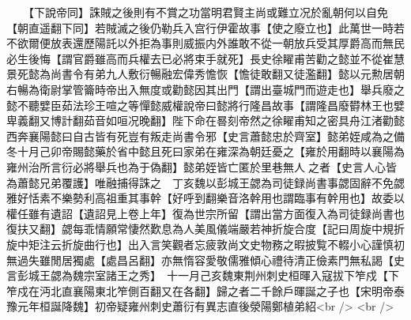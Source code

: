 　　【下說帝同】誅賊之後則有不賞之功當明君賢主尚或難立况於亂朝何以自免【朝直遥翻下同】若賊滅之後仍勒兵入宫行伊霍故事【使之廢立也】此萬世一時若不欲爾便放表還歷陽託以外拒為事則威振内外誰敢不從一朝放兵受其厚爵高而無民必生後悔【謂官爵雖高而兵權去已必將束手就死】長史徐矅甫苦勸之懿並不從崔慧景死懿為尚書令有弟九人敷衍暢融宏偉秀憺恢【憺徒敢翻又徒濫翻】懿以元勲居朝右暢為衛尉掌管籥時帝出入無度或勸懿因其出門【謂出臺城門而遊走也】舉兵廢之懿不聽嬖臣茹法珍王喧之等憚懿威權說帝曰懿將行隆昌故事【謂隆昌廢欎林王也嬖卑義翻又博計翻茹音如咺况晚翻】陛下命在晷刻帝然之徐矅甫知之密具舟江渚勸懿西奔襄陽懿曰自古皆有死豈有叛走尚書令邪【史言蕭懿忠於齊室】懿弟姪咸為之備冬十月己卯帝賜懿藥於省中懿且死曰家弟在雍深為朝廷憂之【雍於用翻時以襄陽為雍州治所言衍必將舉兵也為于偽翻】懿弟姪皆亡匿於里巷無人之者【史言人心皆為蕭懿兄弟覆護】唯融捕得誅之　丁亥魏以彭城王勰為司徒録尚書事勰固辭不免勰雅好恬素不樂勢利高祖重其事幹【好呼到翻樂音洛幹用也謂臨事有幹用也】故委以權任雖有遺詔【遺詔見上卷上年】復為世宗所留【謂出當方面復入為司徒録尚書也復扶又翻】勰每乖情願常悽然歎息為人美風儀端嚴若神折旋合度【記曰周旋中規折旋中矩注云折旋曲行也】出入言笑觀者忘疲敦尚文史物務之暇披覧不輟小心謹慎初無過失雖閒居獨處【處昌呂翻】亦無惰容愛敬儒雅傾心禮待清正儉素門無私謁【史言彭城王勰為魏宗室諸王之秀】　十一月己亥魏東荆州刺史桓暉入寇拔下笮戍【下笮戍在沔北直襄陽東北笮側百翻又在各翻】歸之者二千餘戶暉誕之子也【宋明帝泰豫元年桓誕降魏】初帝疑雍州刺史蕭衍有異志直後滎陽鄭植弟紹<br />
<br />
